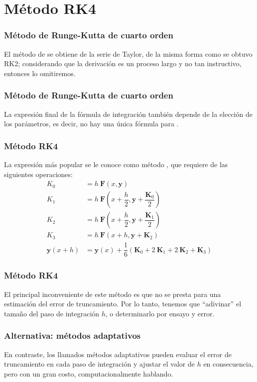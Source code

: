 \section{Método RK4}
\begin{frame}
\frametitle{Método de Runge-Kutta de cuarto orden}
El método de  se obtiene de la serie de Taylor, de la misma forma como se obtuvo RK2; considerando que la derivación es un proceso largo y no tan instructivo, entonces lo omitiremos.
\end{frame}
\begin{frame}
\frametitle{Método de Runge-Kutta de cuarto orden}
La expresión final de la fórmula de integración también depende de la elección de los parámetros, es decir, no hay una única fórmula para .
\end{frame}
\begin{frame}
\frametitle{Método RK4}
La expresión más popular se le conoce como método , que requiere de las siguientes operaciones:
\begin{align*}
K_{0} &= h \: \mathbf{F}(x,\mathbf{y}) \\
K_{1} &= h \: \mathbf{F}(x +\dfrac{h}{2},\mathbf{y} + \dfrac{\mathbf{K}_{0}}{2}) \\
K_{2} &= h \: \mathbf{F}(x +\dfrac{h}{2},\mathbf{y} + \dfrac{\mathbf{K}_{1}}{2}) \\
K_{3} &= h \: \mathbf{F}(x +h, \mathbf{y} + \mathbf{K}_{2}) \\
\mathbf{y}(x+h) &= \mathbf{y}(x) + \dfrac{1}{6} (\mathbf{K}_{0} + 2 \: \mathbf{K}_{1} + 2 \: \mathbf{K}_{2} + \mathbf{K}_{3})
\end{align*}
\end{frame}
\begin{frame}
\frametitle{Método RK4}
El principal inconveniente de este método es que no se presta para una estimación del error de truncamiento. Por lo tanto, tenemos que \enquote{adivinar} el tamaño del paso de integración $h$, o determinarlo por ensayo y error.
\end{frame}
\begin{frame}
\frametitle{Alternativa: métodos adaptativos}
En contraste, los llamados métodos adaptativos pueden evaluar el error de truncamiento en cada paso de integración y ajustar el valor de $h$ en consecuencia, pero con un gran costo, computacionalmente hablando.
\end{frame}
